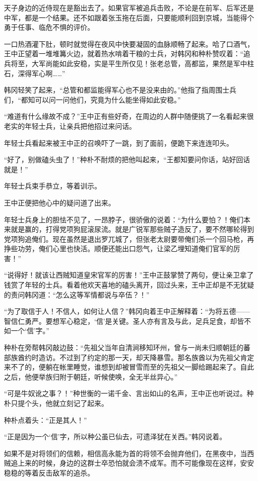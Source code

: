 天子身边的近侍现在是豁出去了。如果官军被追兵击败，不论是在前军、后军还是中军，都是一个结果。还不如跟着张玉拖在后面，只要能顺利回到京城，当能得个勇于任事、临危不惧的评价。

一口热酒灌下肚，顿时就觉得在夜风中快要凝固的血脉顺畅了起来。哈了口酒气，王中正望着一堆堆篝火边，就着热水啃着干粮的士兵，对韩冈和种朴赞叹着：“追兵将至，大军尚能如此安稳，实是平生所仅见！张老总管，高都监，果然是军中柱石，深得军心啊……”

韩冈轻笑了起来，“总管和都监能得军心也不是没来由的。”他指了指周围士兵们，“都知可以问一问他们，究竟为什么能坐得如此安稳。”

“难道有什么缘故不成？”王中正有些好奇，在周边的人群中随便挑了一名看起来很老实的年轻士兵，让亲兵把他招过来问话。

年轻士兵看起来被王中正的召唤吓了一跳，到了面前，便跪下来连连叩头。

“好了，别做磕头虫了！”种朴不耐烦的把他叫起来，“王都知要问你话，站好回话就是！”

年轻士兵束手恭立，等着训示。

王中正便把他心中的疑问道了出来。

年轻士兵身上的胆怯不见了，一昂脖子，很骄傲的说着：“为什么要怕？！俺们本来就是赢的，打得党项狗屁滚尿流。就是广锐军那些贼子造反了，要不然哪轮得到党项狗追俺们。现在虽然是退出罗兀城了，但张老太尉要带俺们杀一个回马枪，再挣些功劳，俺们心里也快活。顺便还能出口怨气，让梁乙埋知道俺们官军的厉害！”

“说得好！就该让西贼知道皇宋官军的厉害！”王中正鼓掌赞了两句，便让亲卫拿了钱赏了年轻的士兵。看着他欢天喜地的磕头离开，回过头来，王中正却是不无犹疑的责问韩冈道：“怎么这等军情都说与卒伍？！”

“为了取信于人！不信人，如何让人信？”韩冈向着王中正解释着：“为将五德——智信仁勇严。要想军心稳定，‘信’是关键。圣人亦有言及与此，足兵足食，却皆不如一个‘信’字。”

种朴在旁帮韩冈敲边鼓：“先祖父当年自清涧移知环州，曾与一尚未归顺朝廷的蕃部族酋约时造访。不过到了约定的那一天，却天降暴雪。那名族酋以为先祖父肯定来不了的，便躺在帐里睡觉，谁想到却被冒雪而至的先祖父一脚给踢起来了。自此之后，他便举族归附于朝廷，听候使唤，全无半丝异心。”

“可是牛奴讹之事？！”种世衡的一诺千金、言出如山的名声，王中正也听说过。种朴只提个头，他就立刻记了起来。

种朴点着头：“正是其人！”

“正是因为一个‘信’字，所以种公虽已仙去，可遗泽犹在关西。”韩冈说着。

如果不是对将领们的信赖，相信高永能为首的将领不会抛弃他们，在黑夜中，当西贼追上来的时候，身边的这群士卒恐怕就会溃不成军。而不可能像现在这样，安安稳稳的等着反击敌军的追杀。

